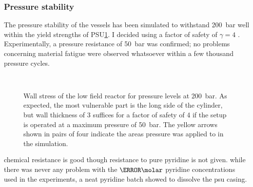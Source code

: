         \subsubsection{Pressure stability}
        The pressure stability of the vessels has been simulated to withstand \SI{200}{\bar} well within the yield strengths of PSU\ref{fig:results:bubblingReactorPressure}. I decided using a factor of safety of $\gamma = 4$ . Experimentally, a pressure resistance of \SI{50}{\bar} was confirmed; no problems concerning material fatigue were observed whatsoever within a few thousand pressure cycles.
        \begin{figure}
            \label{fig:results:bubblingReactorPressure}
            \centering
                \hfill
                \\
                \hfill
                \caption[Reactor wall stress simulations]{Wall stress of the low field reactor for pressure levels at \SI{200}{\bar}. As expected, the most vulnerable part is the long side of the cylinder, but wall thickness of \si{3}{\milli\meter} suffices for a factor of safety of 4 if the setup is operated at a maximum pressure of \SI{50}{\bar}. The yellow arrows shown in pairs of four indicate the areas pressure was applied to in the simulation.}
        \end{figure}
        
        chemical resistance is good though resistance to pure pyridine is not given. while there was never
        any problem with the $\si{}{\milli\molar}$ pyridine concentrations used in the experiments, a
        neat pyridine batch showed to dissolve the psu casing.
